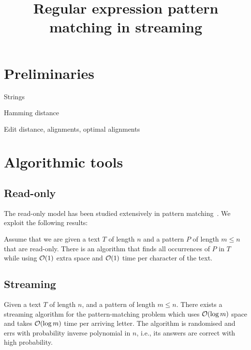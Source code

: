 \documentclass{article}
\title{Regular expression pattern matching in streaming}
\author{}
\date{}
\begin{document}
\maketitle

\section{Preliminaries}
Strings

Hamming distance

Edit distance, alignments, optimal alignments

\section{Algorithmic tools}

\subsection{Read-only}
The read-only model has been studied extensively in pattern matching~\cite{RYTTER2003763,10.1145/322234.322244,DBLP:conf/cpm/GasieniecPR95,
DBLP:journals/tcs/GasieniecPR95,DBLP:journals/tcs/Crochemore92,
Crochemore:1991:TS:116825.116845,GALIL1983280,BRESLAUER20132,BRESLAUER1996177,GALIL1981331,10.1007/3-540-60044-2_36}.
We exploit the following results: 

\begin{theorem}
\label{th:constant-space-pm}
Assume that we are given a text $T$ of length $n$ and a pattern $P$ of length $m \le n$ that are read-only. There is an algorithm that finds all occurrences of $P$ in $T$ while using $\mathcal{O}(1)$ extra space and $\mathcal{O}(1)$ time per character of the text.  
\end{theorem}

\subsection{Streaming}
\begin{theorem}
\label{th:streaming-pm}
Given a text $T$ of length $n$, and a pattern of length $m \leq n$. 
There  exists  a  streaming algorithm for the pattern-matching problem which  uses $\mathcal{O}(\log m)$ space  and takes $ \mathcal{O}(\log m)$ time per arriving letter.  The  algorithm  is  randomised  and  errs  with  probability inverse polynomial in $n$, i.e., its answers are correct with high probability.
\end{theorem}
\end{document}
